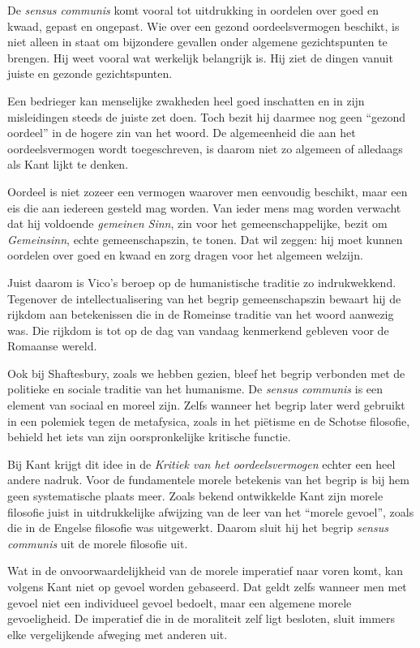 De \textit{sensus communis} komt vooral tot uitdrukking in oordelen over goed en kwaad, gepast en ongepast. Wie over een gezond oordeelsvermogen beschikt, is niet alleen in staat om bijzondere gevallen onder algemene gezichtspunten te brengen. Hij weet vooral wat werkelijk belangrijk is. Hij ziet de dingen vanuit juiste en gezonde gezichtspunten.

Een bedrieger kan menselijke zwakheden heel goed inschatten en in zijn misleidingen steeds de juiste zet doen. Toch bezit hij daarmee nog geen ``gezond oordeel'' in de hogere zin van het woord. De algemeenheid die aan het oordeelsvermogen wordt toegeschreven, is daarom niet zo algemeen of alledaags als Kant lijkt te denken.

Oordeel is niet zozeer een vermogen waarover men eenvoudig beschikt, maar een eis die aan iedereen gesteld mag worden. Van ieder mens mag worden verwacht dat hij voldoende \textit{gemeinen Sinn}, zin voor het gemeenschappelijke, bezit om \textit{Gemeinsinn}, echte gemeenschapszin, te tonen. Dat wil zeggen: hij moet kunnen oordelen over goed en kwaad en zorg dragen voor het algemeen welzijn.

Juist daarom is Vico's beroep op de humanistische traditie zo indrukwekkend. Tegenover de intellectualisering van het begrip gemeenschapszin bewaart hij de rijkdom aan betekenissen die in de Romeinse traditie van het woord aanwezig was. Die rijkdom is tot op de dag van vandaag kenmerkend gebleven voor de Romaanse wereld.

Ook bij Shaftesbury, zoals we hebben gezien, bleef het begrip verbonden met de politieke en sociale traditie van het humanisme. De \textit{sensus communis} is een element van sociaal en moreel zijn. Zelfs wanneer het begrip later werd gebruikt in een polemiek tegen de metafysica, zoals in het piëtisme en de Schotse filosofie, behield het iets van zijn oorspronkelijke kritische functie.

Bij Kant krijgt dit idee in de \textit{Kritiek van het oordeelsvermogen} echter een heel andere nadruk. Voor de fundamentele morele betekenis van het begrip is bij hem geen systematische plaats meer. Zoals bekend ontwikkelde Kant zijn morele filosofie juist in uitdrukkelijke afwijzing van de leer van het ``morele gevoel'', zoals die in de Engelse filosofie was uitgewerkt. Daarom sluit hij het begrip \textit{sensus communis} uit de morele filosofie uit.

Wat in de onvoorwaardelijkheid van de morele imperatief naar voren komt, kan volgens Kant niet op gevoel worden gebaseerd. Dat geldt zelfs wanneer men met gevoel niet een individueel gevoel bedoelt, maar een algemene morele gevoeligheid. De imperatief die in de moraliteit zelf ligt besloten, sluit immers elke vergelijkende afweging met anderen uit.

